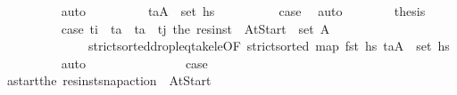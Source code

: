 \begin{isabellebody}
\ \ \ \ \ \ \ \ \isamarkupfalse%
\ auto\isanewline
\ \ \ \ \ \ \isamarkupfalse%
\ \isamarkupfalse%
\ {\isachardoublequoteopen}{\isacharparenleft}{\kern0pt}t\isactrlsub a{\isacharcomma}{\kern0pt}A{\isacharprime}{\kern0pt}{\isacharparenright}{\kern0pt}\ {\isasymin}\ set\ hs\isanewline
\ \ \ \ \ \ \ \ \isamarkupfalse%
\ {\isacartoucheopen}{\isacharquery}{\kern0pt}case{}{\isacartoucheclose}\ \isamarkupfalse%
\ auto\isanewline
\ \ \ \ \ \ \isamarkupfalse%
\ {\isacharquery}{\kern0pt}thesis\isanewline
\ \ \ \ \ \ \ \ \isamarkupfalse%
\ {\isacartoucheopen}{\isacharquery}{\kern0pt}case{}{\isacartoucheclose}\ {\isacartoucheopen}t\isactrlsub i\ {\isacharless}{\kern0pt}\ t\isactrlsub a\ {\isasymand}\ t\isactrlsub a\ {\isacharless}{\kern0pt}\ t\isactrlsub j{\isacartoucheclose}\ {\isacartoucheopen}the\ {\isacharparenleft}{\kern0pt}res{\isacharunderscore}{\kern0pt}inst\ {\isasympi}\ At{\isacharunderscore}{\kern0pt}Start{\isacharparenright}{\kern0pt}\ {\isasymin}\ set\ A{\isacharprime}{\kern0pt}{\isacartoucheclose}\isanewline
\ \ \ \ \ \ \ \ \ \ \ \ \ \ strict{\isacharunderscore}{\kern0pt}sorted{\isacharunderscore}{\kern0pt}drop{\isacharunderscore}{\kern0pt}leq{\isacharunderscore}{\kern0pt}take{\isacharunderscore}{\kern0pt}le{\isacharbrackleft}{\kern0pt}OF\ {\isacartoucheopen}strict{\isacharunderscore}{\kern0pt}sorted\ {\isacharparenleft}{\kern0pt}map\ fst\ hs\ {\isacartoucheopen}{\isacharparenleft}{\kern0pt}t\isactrlsub a{\isacharcomma}{\kern0pt}A{\isacharprime}{\kern0pt}{\isacharparenright}{\kern0pt}\ {\isasymin}\ set\ hs\isanewline
\ \ \ \ \ \ \ \ \isamarkupfalse%
\ auto\ \ \ \isanewline
\ \ \ \ \isamarkupfalse%
\isanewline
\ \ \ \ \ \ \isamarkupfalse%
\ {\isacharquery}{\kern0pt}case{}\isanewline
\ \ \ \ \ \ \isamarkupfalse%
\ {\isacharquery}{\kern0pt}a\isactrlsub s\isactrlsub t\isactrlsub a\isactrlsub r\isactrlsub t{\isacharequal}{\kern0pt}{\isachardoublequoteopen}the\ {\isacharparenleft}{\kern0pt}res{\isacharunderscore}{\kern0pt}inst{\isacharunderscore}{\kern0pt}snap{\isacharunderscore}{\kern0pt}action\ {\isasympi}\ At{\isacharunderscore}{\kern0pt}Start{\isacharparenright}{\kern0pt}{\isachardoublequoteclose}\isanewline

\end{isabellebody}
